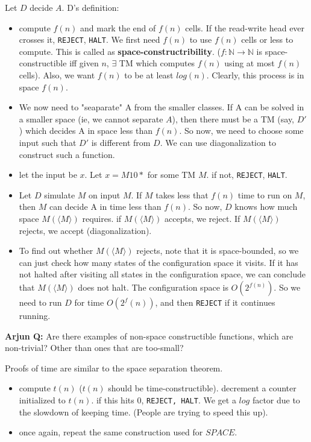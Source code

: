 Let $D$ decide $A$. D's definition:
\begin{itemize}
    \item compute $f(n)$ and mark the end of $f(n)$ cells. If the read-write head
        ever crosses it, \texttt{REJECT}, \texttt{HALT}. We first need
        $f(n)$ to use $f(n)$ cells or less to compute. This is called as 
        \textbf{space-constructribility}. ($f: \mathbb{N} \to \mathbb{N}$ is
        space-constructible iff given $n$, $\exists$ TM which computes $f(n)$ 
        using at most $f(n)$ cells). Also, we want $f(n)$ to be at least
        $log(n)$. Clearly, this process is in space $f(n)$.

    \item We now need to "seaparate" A from the smaller classes. If A can be
        solved in a smaller space (ie, we cannot separate $A$), then
        there must be a TM (say, $D'$) which decides A in space less than $f(n)$.
        So now, we need to choose some input such that $D'$ is different from $D$.
        We can use diagonalization to construct such a function.

    \item let the input be $x$. Let $x = M10*$ for some TM $M$. if not,
        \texttt{REJECT}, \texttt{HALT}.

    \item Let $D$ simulate $M$ on input $M$. If $M$ takes less that $f(n)$
        time to run on $M$, then $M$ can decide A in time less than $f(n)$.
        So now, $D$ knows how much space $M(\langle M \rangle)$ requires. if $M(\langle M \rangle)$
        accepts, we reject.  If $M(\langle M \rangle)$ rejects, we accept (diagonalization).

    \item To find out whether $M(\langle M \rangle)$ rejects, note that it is space-bounded, so
        we can just check how many states of the configuration space it visits.
        If it has not halted after visiting all states in the configuration
        space, we can conclude that $M(\langle M \rangle)$ does not halt. The configuration space
        is $O(2^{f(n)})$. So we need to run $D$ for time $O(2^f(n))$, and then
        \texttt{REJECT} if it continues running.
\end{itemize}

\textbf{Arjun Q:} Are there examples of non-space constructible functions, which are non-trivial?
Other than ones that are too-small?


Proofs of time are similar to the space separation theorem.
\begin{itemize}
    \item compute $t(n)$ ($t(n)$ should be time-constructible).
        decrement a counter initialized to $t(n)$. if this hits $0$, 
        \texttt{REJECT, HALT}. We get a $log$ factor due to the slowdown
        of keeping time. (People are trying to speed this up).

    \item once again, repeat the same construction used for $SPACE$.
\end{itemize}

